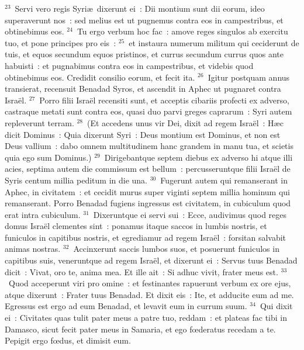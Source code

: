 ${}^{23}$~Servi vero regis Syri\ae\ dixerunt ei~: Dii montium sunt dii eorum, ideo superaverunt nos~: sed melius est ut pugnemus contra eos in campestribus, et obtinebimus eos.
${}^{24}$~Tu ergo verbum hoc fac~: amove reges singulos ab exercitu tuo, et pone principes pro eis~:
${}^{25}$~et instaura numerum militum qui ceciderunt de tuis, et equos secundum equos pristinos, et currus secundum currus quos ante habuisti~: et pugnabimus contra eos in campestribus, et videbis quod obtinebimus eos. Credidit consilio eorum, et fecit ita.
${}^{26}$~Igitur postquam annus transierat, recensuit Benadad Syros, et ascendit in Aphec ut pugnaret contra Isra\"el.
${}^{27}$~Porro filii Isra\"el recensiti sunt, et acceptis cibariis profecti ex adverso, castraque metati sunt contra eos, quasi duo parvi greges caprarum~: Syri autem repleverunt terram.
${}^{28}$~(Et accedens unus vir Dei, dixit ad regem Isra\"el~: H\ae c dicit Dominus~: Quia dixerunt Syri~: Deus montium est Dominus, et non est Deus vallium~: dabo omnem multitudinem hanc grandem in manu tua, et scietis quia ego sum Dominus.)
${}^{29}$~Dirigebantque septem diebus ex adverso hi atque illi acies, septima autem die commissum est bellum~: percusseruntque filii Isra\"el de Syris centum millia peditum in die una.
${}^{30}$~Fugerunt autem qui remanserant in Aphec, in civitatem~: et cecidit murus super viginti septem millia hominum qui remanserant. Porro Benadad fugiens ingressus est civitatem, in cubiculum quod erat intra cubiculum.
${}^{31}$~Dixeruntque ei servi sui~: Ecce, audivimus quod reges domus Isra\"el clementes sint~: ponamus itaque saccos in lumbis nostris, et funiculos in capitibus nostris, et egrediamur ad regem Isra\"el~: forsitan salvabit animas nostras.
${}^{32}$~Accinxerunt saccis lumbos suos, et posuerunt funiculos in capitibus suis, veneruntque ad regem Isra\"el, et dixerunt ei~: Servus tuus Benadad dicit~: Vivat, oro te, anima mea. Et ille ait~: Si adhuc vivit, frater meus est.
${}^{33}$~Quod acceperunt viri pro omine~: et festinantes rapuerunt verbum ex ore ejus, atque dixerunt~: Frater tuus Benadad. Et dixit eis~: Ite, et adducite eum ad me. Egressus est ergo ad eum Benadad, et levavit eum in currum suum.
${}^{34}$~Qui dixit ei~: Civitates quas tulit pater meus a patre tuo, reddam~: et plateas fac tibi in Damasco, sicut fecit pater meus in Samaria, et ego fœderatus recedam a te. Pepigit ergo fœdus, et dimisit eum.


